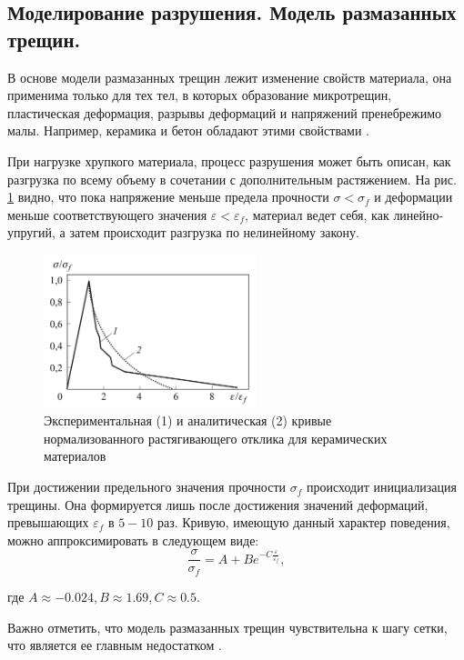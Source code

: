 \documentclass[12pt, a4paper]{article}
\begin{document}
\subsection{Моделирование разрушения. Модель размазанных трещин.}

В основе модели размазанных трещин лежит изменение свойств материала, она применима только для тех тел, в которых образование микротрещин, пластическая деформация, разрывы деформаций и напряжений пренебрежимо малы. Например, керамика и бетон обладают этими свойствами \cite{smeared crack}.

При нагрузке хрупкого материала, процесс разрушения может быть описан, как разгрузка по всему объему в сочетании с дополнительным растяжением. На рис. \ref{fig:ceramic} видно, что пока напряжение меньше предела прочности $\sigma < \sigma_f$  и деформации меньше соответствующего значения $\varepsilon < \varepsilon_f$, материал ведет себя, как линейно-упругий, а затем происходит разгрузка по нелинейному закону.
\begin{figure}[h]
	\centering
	\includegraphics[width=0.55\textwidth]{ceramic}
	\caption{Экспериментальная (1) и аналитическая (2) кривые нормализованного растягивающего отклика для керамических материалов}
	\label{fig:ceramic}
\end{figure}

\pagebreak

При достижении предельного значения прочности $\sigma_f$ происходит инициализация трещины. Она формируется лишь после достижения значений деформаций, превышающих $\varepsilon_f$ в $5-10$ раз. Кривую, имеющую данный характер поведения, можно аппроксимировать в следующем виде:
\[
\dfrac{\sigma}{\sigma_f} = A + B e^{-C\tfrac{\varepsilon}{\varepsilon_f}},
\]

\noindent где $A \approx -0.024, B \approx 1.69, C \approx 0.5$.

Важно отметить, что модель размазанных трещин чувствительна к шагу сетки, что является ее главным недостатком \cite{galanin2}.
\end{document}

